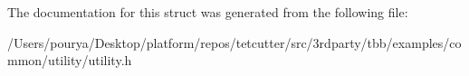The documentation for this struct was generated from the following file\+:\begin{DoxyCompactItemize}
\item 
/\+Users/pourya/\+Desktop/platform/repos/tetcutter/src/3rdparty/tbb/examples/common/utility/utility.\+h\end{DoxyCompactItemize}
